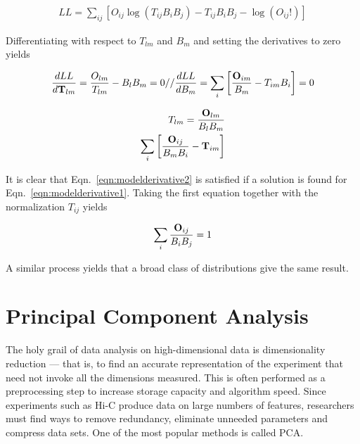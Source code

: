 \begin{align}
  \label{eqn:llmodel}
  LL = \sum_{ij}\left[O_{ij}\log{(T_{ij}B_{i}B_{j})} - T_{ij}B_{i}B_{j} - \log{(O_{ij}!)}\right]
\end{align}

Differentiating with respect to $T_{lm}$ and $B_m$ and setting the derivatives to zero yields

\begin{multicols}{2}
  \begin{align}
    \label{eqn:modelderivative1}
    \begin{split}
      \frac{dLL}{d\mathbf{T}_{lm}} = \frac{O_{lm}}{T_{lm}} - B_{l}B_{m} = 0
      //
      \frac{dLL}{dB_{m}} = \sum_i\left[\frac{\mathbf{O}_{im}}{B_m} - T_{im}B_i\right] = 0
    \end{split}
  \end{align}

  \break%

  \begin{align}
    \label{eqn:modelderivative2}
    \begin{split}
      T_{lm} = \frac{\mathbf{O}_{lm}}{B_{l}B_{m}}
      \\
      \sum_i\left[\frac{\mathbf{O}_{ij}}{B_{m}B_{i}} - \mathbf{T}_{im}\right]
    \end{split}
  \end{align}
\end{multicols}

It is clear that Eqn.~\eqref{eqn:modelderivative2} is satisfied if a solution is found for Eqn.~\eqref{eqn:modelderivative1}.  Taking the first equation together  with the
normalization $T_{ij}$ yields

\begin{align}
  \label{eqn:result}
  \sum_i \frac{\mathbf{O}_{ij}}{B_{i}B_{j}} = 1
\end{align}

A similar process yields that a broad class of distributions give the same result\cite{imakaev2012}.

\section*{Principal Component Analysis}

The holy grail of data analysis on high-dimensional data is dimensionality reduction --- that is, to find an accurate representation of
the experiment that need not invoke all the dimensions measured.  This is often performed as a preprocessing step to increase storage capacity
and algorithm speed.  Since experiments such as Hi-C produce data on large numbers of features, researchers must find ways to remove redundancy,
eliminate unneeded parameters and compress data sets.  One of the most popular methods is called \gls{PCA}\cite{law1987}.

